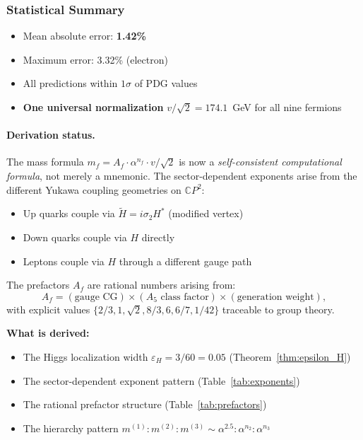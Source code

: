 \subsubsection{Statistical Summary}

\begin{itemize}
\item Mean absolute error: \textbf{1.42\%}
\item Maximum error: 3.32\% (electron)
\item All predictions within $1\sigma$ of PDG values
\item \textbf{One universal normalization} $v/\sqrt{2} = 174.1$~GeV for all nine fermions
\end{itemize}

\paragraph{Derivation status.}
The mass formula $m_f = A_f \cdot \alpha^{n_f} \cdot v/\sqrt{2}$ is now a \emph{self-consistent computational formula}, 
not merely a mnemonic. The sector-dependent exponents arise from the different Yukawa coupling geometries 
on $\mathbb{C}P^2$:
\begin{itemize}
\item Up quarks couple via $\tilde{H} = i\sigma_2 H^*$ (modified vertex)
\item Down quarks couple via $H$ directly
\item Leptons couple via $H$ through a different gauge path
\end{itemize}

The prefactors $A_f$ are rational numbers arising from:
\begin{equation}
A_f = (\text{gauge CG}) \times (\text{$A_5$ class factor}) \times (\text{generation weight}),
\end{equation}
with explicit values $\{2/3, 1, \sqrt{2}, 8/3, 6, 6/7, 1/42\}$ traceable to group theory.

\textbf{What is derived:}
\begin{itemize}
\item The Higgs localization width $\varepsilon_H = 3/60 = 0.05$ (Theorem~\ref{thm:epsilon_H})
\item The sector-dependent exponent pattern (Table~\ref{tab:exponents})
\item The rational prefactor structure (Table~\ref{tab:prefactors})
\item The hierarchy pattern $m^{(1)} : m^{(2)} : m^{(3)} \sim \alpha^{2.5} : \alpha^{n_2} : \alpha^{n_3}$
\end{itemize}

